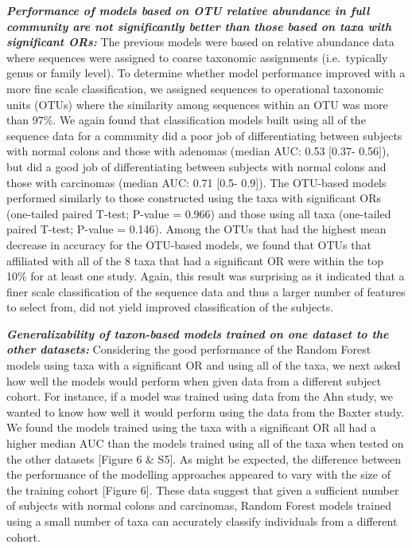 \documentclass[12pt,]{article}
\begin{document}
\textbf{\emph{Performance of models based on OTU relative abundance in
full community are not significantly better than those based on taxa
with significant ORs:}} The previous models were based on relative
abundance data where sequences were assigned to coarse taxonomic
assignments (i.e.~typically genus or family level). To determine whether
model performance improved with a more fine scale classification, we
assigned sequences to operational taxonomic units (OTUs) where the
similarity among sequences within an OTU was more than 97\%. We again
found that classification models built using all of the sequence data
for a community did a poor job of differentiating between subjects with
normal colons and those with adenomas (median AUC: 0.53 {[}0.37-
0.56{]}), but did a good job of differentiating between subjects with
normal colons and those with carcinomas (median AUC: 0.71 {[}0.5-
0.9{]}). The OTU-based models performed similarly to those constructed
using the taxa with significant ORs (one-tailed paired T-test; P-value =
0.966) and those using all taxa (one-tailed paired T-test; P-value =
0.146). Among the OTUs that had the highest mean decrease in accuracy
for the OTU-based models, we found that OTUs that affiliated with all of
the 8 taxa that had a significant OR were within the top 10\% for at
least one study. Again, this result was surprising as it indicated that
a finer scale classification of the sequence data and thus a larger
number of features to select from, did not yield improved classification
of the subjects.

\textbf{\emph{Generalizability of taxon-based models trained on one
dataset to the other datasets:}} Considering the good performance of the
Random Forest models using taxa with a significant OR and using all of
the taxa, we next asked how well the models would perform when given
data from a different subject cohort. For instance, if a model was
trained using data from the Ahn study, we wanted to know how well it
would perform using the data from the Baxter study. We found the models
trained using the taxa with a significant OR all had a higher median AUC
than the models trained using all of the taxa when tested on the other
datasets {[}Figure 6 \& S5{]}. As might be expected, the difference
between the performance of the modelling approaches appeared to vary
with the size of the training cohort {[}Figure 6{]}. These data suggest
that given a sufficient number of subjects with normal colons and
carcinomas, Random Forest models trained using a small number of taxa
can accurately classify individuals from a different cohort.
\end{document}
